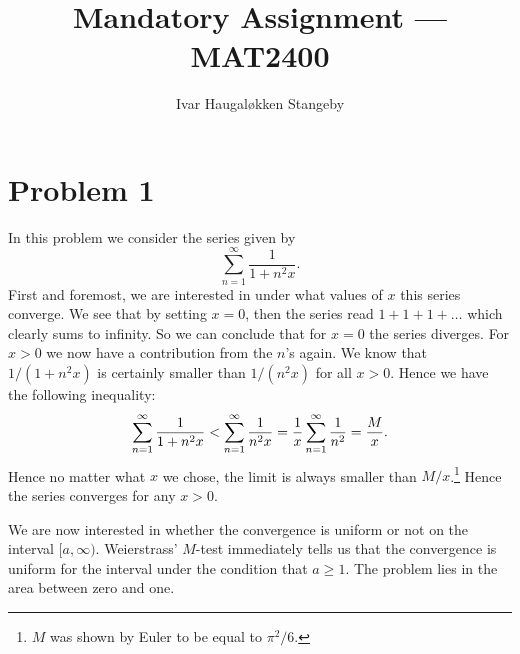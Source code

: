 \documentclass{article}
\title{Mandatory Assignment --- MAT2400}
\author{Ivar Haugaløkken Stangeby}
\begin{document}
    \maketitle

    \section*{Problem 1}
    
    In this problem we consider the series given by
    \begin{equation}
        \label{eq:series}
        \sum^{\infty}_{n=1} \frac{1}{1 + n^2x}.
    \end{equation}
    First and foremost, we are interested in under what values of $x$ this
    series converge.  We see that by setting $x = 0$, then the series read $1 +
    1 + 1 + \ldots$ which clearly sums to infinity. So we can conclude that for
    $x = 0$ the series diverges. For $x > 0$ we now have a contribution from
    the $n$'s again.  We know that $1 /(1 + n^2x)$ is certainly smaller than $1
    / (n^2x)$ for all $x > 0$.  Hence we have the following inequality:
    \begin{equation}
        \notag
        \sum^{\infty}_{n=1} \frac{1}{1 + n^2x} 
        < \sum^{\infty}_{n = 1} \frac{1}{n^2x} 
        = \frac{1}{x} \sum^{\infty}_{n=1} \frac{1}{n^2} = \frac{M}{x}.
    \end{equation}
    Hence no matter what $x$ we chose, the limit is always smaller than $M /
    x$.\footnote{$M$ was shown by Euler to be equal to $\pi^2 / 6$.} 
    Hence the series converges for any $x > 0$.

    We are now interested in whether the convergence is uniform or not on the
    interval $[a, \infty)$. Weierstrass' $M$-test immediately tells us that the
    convergence is uniform for the interval under the condition that $a
    \geq 1$. The problem lies in the area between zero and one.
\end{document}
